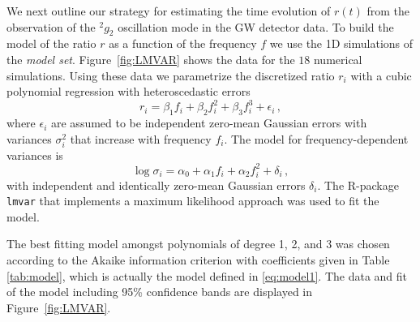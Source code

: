 We next outline our strategy for estimating the time evolution of $r(t)$
from the observation of the $\mbox{}^2g_2$ oscillation mode in the GW detector data.
To build the model of the ratio $r$ as a function of the frequency $f$ we use the 
1D simulations of the {\it model set}. Figure~\ref{fig:LMVAR}
shows the data for the $18$ numerical simulations. 
Using these data we parametrize the discretized ratio $r_i$ with a cubic polynomial
regression with heteroscedastic errors
\begin{equation}
\label{eq:model1}
r_i=\beta_1 f_i + \beta_2 f_i^2 +\beta_3 f_i^3 + \epsilon_i\,,
\end{equation}
where $\epsilon_i$ are assumed to be independent zero-mean Gaussian errors with
variances $\sigma_i^2$ that increase with frequency $f_i$. The model for frequency-dependent
variances is
\begin{equation}
\log \sigma_i=\alpha_0+ \alpha_1 f_i + \alpha_2 f_i^2 + \delta_i\,,
\end{equation}
with independent and identically zero-mean Gaussian errors $\delta_i$. The R-package \texttt{lmvar}
\cite{lmvar:2019} that implements a maximum likelihood approach was used to fit the model.

The best fitting model amongst polynomials of degree 1, 2, and 3  was chosen according to
the Akaike information criterion with coefficients given in Table \ref{tab:model}, which is actually the model defined in \eqref{eq:model1}.  The data and fit of the model including 95\% confidence bands are displayed in
Figure~\ref{fig:LMVAR}.


